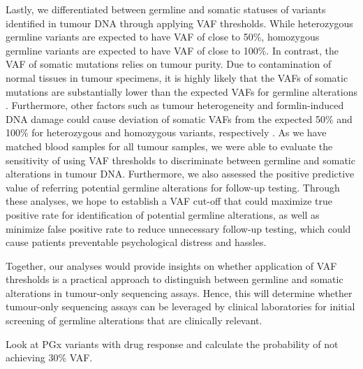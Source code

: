 Lastly, we differentiated between germline and somatic statuses of variants identified in tumour DNA through applying VAF thresholds. While heterozygous germline variants are expected to have VAF of close to 50\%, homozygous germline variants are expected to have VAF of close to 100\%. In contrast, the VAF of somatic mutations relies on tumour purity. Due to contamination of normal tissues in tumour specimens, it is highly likely that the VAFs of somatic mutations are substantially lower than the expected VAFs for germline alterations \cite{}. Furthermore, other factors such as tumour heterogeneity and formlin-induced DNA damage could cause deviation of somatic VAFs from the expected 50\% and 100\% for heterozygous and homozygous variants, respectively \cite{}. As we have matched blood samples for all tumour samples, we were able to evaluate the sensitivity of using VAF thresholds to discriminate between germline and somatic alterations in tumour DNA. Furthermore, we also assessed the positive predictive value of referring potential germline alterations for follow-up testing. Through these analyses, we hope to establish a VAF cut-off that could maximize true positive rate for identification of potential germline alterations, as well as minimize false positive rate to reduce unnecessary follow-up testing, which could cause patients preventable psychological distress and hassles.

Together, our analyses would provide insights on whether application of VAF thresholds is a practical approach to distinguish between germline and somatic alterations in tumour-only sequencing assays. Hence, this will determine whether tumour-only sequencing assays can be leveraged by clinical laboratories for initial screening of germline alterations that are clinically relevant.


Look at PGx variants with drug response and calculate the probability of not achieving 30\% VAF.

\pagebreak

